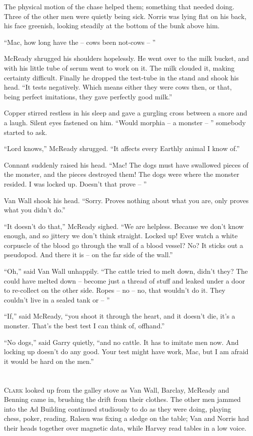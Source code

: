 \documentclass[ebook,oneside,11pt]{memoir}				%
\begin{document}
The physical motion of the chase helped them; something that needed doing. Three of the other men were quietly being sick. Norris was lying flat on his back, his face greenish, looking steadily at the bottom of the bunk above him.

``Mac, how long have the -- cows been not-cows -- ''

McReady shrugged his shoulders hopelessly. He went over to the milk bucket, and with his little tube of serum went to work on it. The milk clouded it, making certainty difficult. Finally he dropped the test-tube in the stand and shook his head. ``It tests negatively. Which means either they were cows then, or that, being perfect imitations, they gave perfectly good milk.''

Copper stirred restless in his sleep and gave a gurgling cross between a snore and a laugh. Silent eyes fastened on him. ``Would morphia -- a monster -- '' somebody started to ask.

``Lord knows,'' McReady shrugged. ``It affects every Earthly animal I know of.''

Connant suddenly raised his head. ``Mac! The dogs must have swallowed pieces of the monster, and the pieces destroyed them! The dogs were where the monster resided. I was locked up. Doesn't that prove -- ''

Van Wall shook his head. ``Sorry. Proves nothing about what you are, only proves what you didn't do.''

``It doesn't do that,'' McReady sighed. ``We are helpless. Because we don't know enough, and so jittery we don't think straight. Locked up! Ever watch a white corpuscle of the blood go through the wall of a blood vessel? No? It sticks out a pseudopod. And there it is -- on the far side of the wall.''

``Oh,'' said Van Wall unhappily. ``The cattle tried to melt down, didn't they? The could have melted down -- become just a thread of stuff and leaked under a door to re-collect on the other side. Ropes -- no -- no, that wouldn't do it. They couldn't live in a sealed tank or -- ''

``If,'' said McReady, ``you shoot it through the heart, and it doesn't die, it's a monster. That's the best test I can think of, offhand.''

``No dogs,'' said Garry quietly, ``and no cattle. It has to imitate men now. And locking up doesn't do any good. Your test might have work, Mac, but I am afraid it would be hard on the men.'' 

\chapter[Chapter 10]{}
\lettrine[lines=3,findent=3pt,nindent=2pt]{C}{lark} looked up from the galley stove as Van Wall, Barclay, McReady and Benning came in, brushing the drift from their clothes. The other men jammed into the Ad Building continued studiously to do as they were doing, playing chess, poker, reading. Ralsen was fixing a sledge on the table; Van and Norris had their heads together over magnetic data, while Harvey read tables in a low voice.
\end{document}
